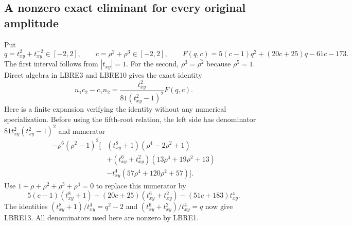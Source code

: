 \documentclass[11pt,a4paper]{article}
\begin{document}
\subsection{A nonzero exact eliminant for every original amplitude}
Put
\[
 q=t_{xy}^2+t_{xy}^{-2}\in[-2,2],\qquad
 c=\rho^2+\rho^3\in[-2,2],\qquad
 F(q,c)=5(c-1)q^2+(20c+25)q-61c-173.
 \tag{LBRE12}
\]
The first interval follows from $|t_{xy}|=1$. For the second,
$\rho^3=\overline{\rho^2}$ because $\rho^5=1$.
Direct algebra in LBRE3 and LBRE10 gives the exact identity
\[
 n_1c_2-c_1n_2
   =\frac{t_{xy}^2}{81(t_{xy}^2-1)^2}F(q,c).
 \tag{LBRE13}
\]
Here is a finite expansion verifying the identity without any
numerical specialization. Before using the fifth-root relation,
the left side has denominator $81t_{xy}^2(t_{xy}^2-1)^2$ and
numerator
\[
 \begin{split}
 -\rho^6(\rho^2-1)^2\bigl[
 &(t_{xy}^8+1)(\rho^4-2\rho^2+1)\\
 &+(t_{xy}^6+t_{xy}^2)(13\rho^4+19\rho^2+13)\\
 &-t_{xy}^4(57\rho^4+120\rho^2+57)\bigr].
 \end{split}\tag{LBRE14}
\]
Use $1+\rho+\rho^2+\rho^3+\rho^4=0$ to replace this numerator by
\[
 5(c-1)(t_{xy}^8+1)+(20c+25)(t_{xy}^6+t_{xy}^2)
                         -(51c+183)t_{xy}^4.
 \tag{LBRE15}
\]
The identities
$(t_{xy}^8+1)/t_{xy}^4=q^2-2$ and
$(t_{xy}^6+t_{xy}^2)/t_{xy}^4=q$ now give LBRE13.
All denominators used here are nonzero by LBRE1.
\end{document}
